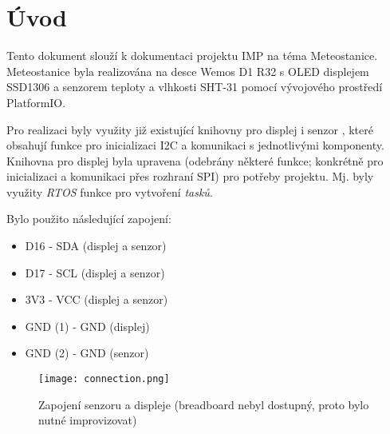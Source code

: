 \section{Úvod}
Tento dokument slouží k dokumentaci projektu IMP na téma Meteostanice.
Meteostanice byla realizována na desce Wemos D1 R32 s OLED displejem SSD1306
a senzorem teploty a vlhkosti SHT-31 pomocí vývojového prostředí PlatformIO.

Pro realizaci byly využity již existující knihovny pro displej
\cite{ssd1306} i senzor \cite{sht3x}, které obsahují funkce pro
inicializaci I2C a komunikaci s jednotlivými komponenty.
Knihovna pro displej byla upravena (odebrány některé funkce; konkrétně pro
inicializaci a komunikaci přes rozhraní SPI) pro potřeby projektu.
Mj. byly využity \textit{RTOS} funkce pro vytvoření \textit{tasků}.

Bylo použito následující zapojení:
\begin{itemize}
	\item D16 - SDA (displej a senzor)
	\item D17 - SCL (displej a senzor)
	\item 3V3 - VCC (displej a senzor)
	\item GND (1) - GND (displej)
	\item GND (2) - GND (senzor)
\end{itemize}

\begin{figure}[h!]
	\texttt{[image: connection.png]}
	\caption{Zapojení senzoru a displeje (breadboard nebyl
	dostupný, proto bylo nutné improvizovat)}
\end{figure}
